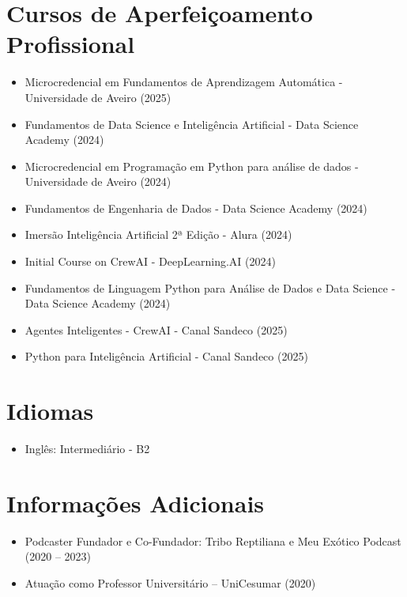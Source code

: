\documentclass[a4paper,10pt]{article} %
\begin{document}
\section*{Cursos de Aperfeiçoamento Profissional}
\begin{itemize}
    \item Microcredencial em Fundamentos de Aprendizagem Automática - Universidade de Aveiro (2025)
    \item Fundamentos de Data Science e Inteligência Artificial - Data Science Academy (2024)
    \item Microcredencial em Programação em Python para análise de dados - Universidade de Aveiro (2024)
    \item Fundamentos de Engenharia de Dados - Data Science Academy (2024)
    \item Imersão Inteligência Artificial 2ª Edição - Alura (2024)
    \item Initial Course on CrewAI - DeepLearning.AI (2024)
    \item Fundamentos de Linguagem Python para Análise de Dados e Data Science - Data Science Academy (2024)
    \item Agentes Inteligentes - CrewAI - Canal Sandeco (2025)
    \item Python para Inteligência Artificial - Canal Sandeco (2025)
\end{itemize}

\section*{Idiomas}
\begin{itemize}
    \item Inglês: Intermediário - B2
\end{itemize}

\section*{Informações Adicionais}
\begin{itemize}
    \item Podcaster Fundador e Co-Fundador: Tribo Reptiliana e Meu Exótico Podcast (2020 – 2023)
    \item Atuação como Professor Universitário – UniCesumar (2020)
\end{itemize}
\end{document}
